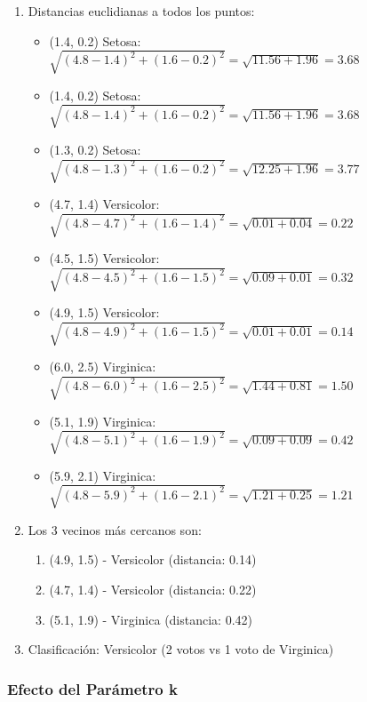 \documentclass[12pt]{article}
\begin{document}
\begin{enumerate}
    \item Distancias euclidianas a todos los puntos:
    \begin{itemize}
        \item (1.4, 0.2) Setosa: $\sqrt{(4.8-1.4)^2 + (1.6-0.2)^2} = \sqrt{11.56 + 1.96} = 3.68$
        \item (1.4, 0.2) Setosa: $\sqrt{(4.8-1.4)^2 + (1.6-0.2)^2} = \sqrt{11.56 + 1.96} = 3.68$
        \item (1.3, 0.2) Setosa: $\sqrt{(4.8-1.3)^2 + (1.6-0.2)^2} = \sqrt{12.25 + 1.96} = 3.77$
        \item (4.7, 1.4) Versicolor: $\sqrt{(4.8-4.7)^2 + (1.6-1.4)^2} = \sqrt{0.01 + 0.04} = 0.22$
        \item (4.5, 1.5) Versicolor: $\sqrt{(4.8-4.5)^2 + (1.6-1.5)^2} = \sqrt{0.09 + 0.01} = 0.32$
        \item (4.9, 1.5) Versicolor: $\sqrt{(4.8-4.9)^2 + (1.6-1.5)^2} = \sqrt{0.01 + 0.01} = 0.14$
        \item (6.0, 2.5) Virginica: $\sqrt{(4.8-6.0)^2 + (1.6-2.5)^2} = \sqrt{1.44 + 0.81} = 1.50$
        \item (5.1, 1.9) Virginica: $\sqrt{(4.8-5.1)^2 + (1.6-1.9)^2} = \sqrt{0.09 + 0.09} = 0.42$
        \item (5.9, 2.1) Virginica: $\sqrt{(4.8-5.9)^2 + (1.6-2.1)^2} = \sqrt{1.21 + 0.25} = 1.21$
    \end{itemize}
    
    \item Los 3 vecinos más cercanos son:
    \begin{enumerate}
        \item (4.9, 1.5) - Versicolor (distancia: 0.14)
        \item (4.7, 1.4) - Versicolor (distancia: 0.22)
        \item (5.1, 1.9) - Virginica (distancia: 0.42)
    \end{enumerate}
    
    \item Clasificación: Versicolor (2 votos vs 1 voto de Virginica)
\end{enumerate}

\subsubsection{Efecto del Parámetro k}
\end{document}
